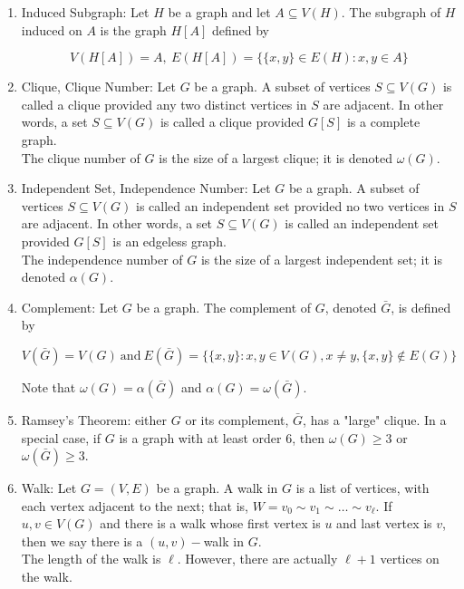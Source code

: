 \documentclass{article}
\begin{document}
\begin{enumerate}
    \item Induced Subgraph: Let $H$ be a graph and let $A\subseteq V(H)$.
    The subgraph of $H$ induced on $A$ is the graph $H[A]$ defined by

    \[V(H[A])=A, \: E(H[A])=\{\{x,y\}\in E(H): x,y\in A\}\]

    \item Clique, Clique Number: Let $G$ be a graph.
    A subset of vertices $S\subseteq V(G)$ is called a clique provided any two distinct vertices in $S$ are adjacent.
    In other words, a set $S\subseteq V(G)$ is called a clique provided $G[S]$ is a complete graph.\\

    The clique number of $G$ is the size of a largest clique;
    it is denoted $\omega (G)$.

    \item Independent Set, Independence Number: Let $G$ be a graph.
    A subset of vertices $S\subseteq V(G)$ is called an independent set provided no two vertices in $S$ are adjacent.
    In other words, a set $S\subseteq V(G)$ is called an independent set provided $G[S]$ is an edgeless graph.\\

    The independence number of $G$ is the size of a largest independent set;
    it is denoted $\alpha (G)$.

    \item Complement: Let $G$ be a graph.
    The complement of $G$, denoted $\bar G$, is defined by

    \[V(\bar G)=V(G)\: \text{and}\: E(\bar G)=\{\{x,y\}: x,y \in V(G), x\neq y, \{x,y\}\not\in E(G)\}\]

    Note that $\omega(G)=\alpha(\bar G)$ and $\alpha(G)=\omega(\bar G)$.

    \item Ramsey's Theorem: either $G$ or its complement, $\bar G$, has a "large" clique.
    In a special case, if $G$ is a graph with at least order $6$, then $\omega(G)\geq 3$ or $\omega(\bar G)\geq 3$.

    \item Walk: Let $G=(V,E)$ be a graph.
    A walk in $G$ is a list of vertices, with each vertex adjacent to the next;
    that is, $W=v_0\sim v_1\sim\dots\sim v_\ell$.
    If $u,v\in V(G)$ and there is a walk whose first vertex is $u$ and last vertex is $v$, then we say there is a $(u,v)-$walk in $G$.\\

    The length of the walk is $\ell$.
    However, there are actually $\ell +1$ vertices on the walk.


\end{enumerate}
\end{document}
